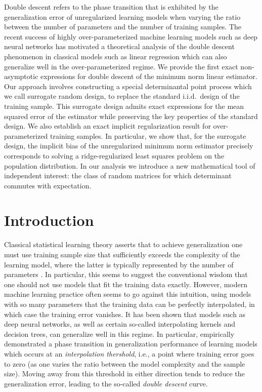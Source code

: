 \documentclass[thesis.tex]{subfiles}
\begin{document}

  Double descent refers to the phase transition that is exhibited by
  the generalization error of unregularized learning models when varying the ratio
  between the number of parameters and the number of training
  samples. The recent success of highly over-parameterized machine learning
  models such as deep neural networks has motivated a theoretical analysis of
  the double descent phenomenon in classical models such as linear
  regression which can also generalize well in the over-parameterized
  regime. We provide the first exact non-asymptotic
  expressions for double descent of the minimum norm linear
  estimator. Our approach involves constructing a special
  determinantal point process  which we call surrogate random
  design, to replace the standard i.i.d.~design of the training
  sample. This surrogate design admits exact expressions for the mean
  squared error of the estimator while preserving the key properties
  of the standard design. We also establish an exact implicit
  regularization result for over-parameterized training samples. In
  particular, we show that, for the surrogate design, the implicit bias
  of the unregularized minimum norm estimator precisely corresponds to
  solving a ridge-regularized least squares problem on the population
  distribution. In our analysis we introduce a new mathematical tool of
  independent interest: the class of random matrices for which
  determinant commutes with expectation.


\section{Introduction}

Classical statistical learning theory asserts that to achieve generalization
one must use training sample size that sufficiently exceeds the complexity of
the learning model, where the latter is typically represented by the number of
parameters \citep[or some related structural parameter; see][]{HFT09}.  In particular,
this seems to suggest the conventional wisdom that one should not use models
that fit the training data exactly.  However, modern machine learning practice
often seems to go against this intuition, using models with so many parameters
that the training data can be perfectly interpolated, in which case the
training error vanishes. It has been shown that models such as deep neural
networks, as well as certain so-called interpolating kernels and decision
trees, can generalize well in this regime. In particular,
\cite{BHMM19} empirically demonstrated a phase transition in generalization
performance of learning models which occurs at an \emph{interpolation
  thershold}, i.e., a point where training error goes to zero (as one varies the
ratio between the model complexity and the sample size). Moving away from this
threshold in either direction tends to reduce the generalization error, leading
to the so-called \emph{double descent} curve.
\end{document}
